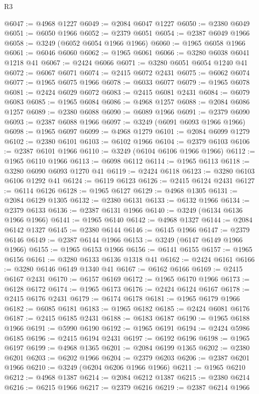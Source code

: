 \begin{lexlean}{R3}
\begin{coremodule}
@6047 := @4968 @1227
@6049 := @2084 @6047 @1227
@6050 := @2380 @6049
@6051 := @6050 @1966
@6052 := @2379 @6051
@6054 := @2387 @6049 @1966
@6058 := @3249 (@6052 @6054 @1966 @1966)
@6060 := @1965 @6058 @1966
@6061 := @6046 @6060
@6062 := @1965 @6061
@6066 := @3280 @6038 @6041 @1218 @41
@6067 := @2424 @6066
@6071 := @3280 @6051 @6054 @1240 @41
@6072 := @6067 @6071
@6074 := @2415 @6072 @2431
@6075 := @6062 @6074
@6077 := @1965 @6075 @1966
@6078 := @6033 @6077
@6079 := @1965 @6078
@6081 := @2424 @6029 @6072
@6083 := @2415 @6081 @2431
@6084 := @6079 @6083
@6085 := @1965 @6084
@6086 := @4968 @1257
@6088 := @2084 @6086 @1257
@6089 := @2380 @6088
@6090 := @6089 @1966
@6091 := @2379 @6090
@6093 := @2387 @6088 @1966
@6097 := @3249 (@6091 @6093 @1966 @1966)
@6098 := @1965 @6097
@6099 := @4968 @1279
@6101 := @2084 @6099 @1279
@6102 := @2380 @6101
@6103 := @6102 @1966
@6104 := @2379 @6103
@6106 := @2387 @6101 @1966
@6110 := @3249 (@6104 @6106 @1966 @1966)
@6112 := @1965 @6110 @1966
@6113 := @6098 @6112
@6114 := @1965 @6113
@6118 := @3280 @6090 @6093 @1270 @41
@6119 := @2424 @6118
@6123 := @3280 @6103 @6106 @1292 @41
@6124 := @6119 @6123
@6126 := @2415 @6124 @2431
@6127 := @6114 @6126
@6128 := @1965 @6127
@6129 := @4968 @1305
@6131 := @2084 @6129 @1305
@6132 := @2380 @6131
@6133 := @6132 @1966
@6134 := @2379 @6133
@6136 := @2387 @6131 @1966
@6140 := @3249 (@6134 @6136 @1966 @1966)
@6141 := @1965 @6140
@6142 := @4968 @1327
@6144 := @2084 @6142 @1327
@6145 := @2380 @6144
@6146 := @6145 @1966
@6147 := @2379 @6146
@6149 := @2387 @6144 @1966
@6153 := @3249 (@6147 @6149 @1966 @1966)
@6155 := @1965 @6153 @1966
@6156 := @6141 @6155
@6157 := @1965 @6156
@6161 := @3280 @6133 @6136 @1318 @41
@6162 := @2424 @6161
@6166 := @3280 @6146 @6149 @1340 @41
@6167 := @6162 @6166
@6169 := @2415 @6167 @2431
@6170 := @6157 @6169
@6172 := @1965 @6170 @1966
@6173 := @6128 @6172
@6174 := @1965 @6173
@6176 := @2424 @6124 @6167
@6178 := @2415 @6176 @2431
@6179 := @6174 @6178
@6181 := @1965 @6179 @1966
@6182 := @6085 @6181
@6183 := @1965 @6182
@6185 := @2424 @6081 @6176
@6187 := @2415 @6185 @2431
@6188 := @6183 @6187
@6190 := @1965 @6188 @1966
@6191 := @5990 @6190
@6192 := @1965 @6191
@6194 := @2424 @5986 @6185
@6196 := @2415 @6194 @2431
@6197 := @6192 @6196
@6198 := @1965 @6197
@6199 := @4968 @1365
@6201 := @2084 @6199 @1365
@6202 := @2380 @6201
@6203 := @6202 @1966
@6204 := @2379 @6203
@6206 := @2387 @6201 @1966
@6210 := @3249 (@6204 @6206 @1966 @1966)
@6211 := @1965 @6210
@6212 := @4968 @1387
@6214 := @2084 @6212 @1387
@6215 := @2380 @6214
@6216 := @6215 @1966
@6217 := @2379 @6216
@6219 := @2387 @6214 @1966

\end{coremodule}
\end{lexlean}
